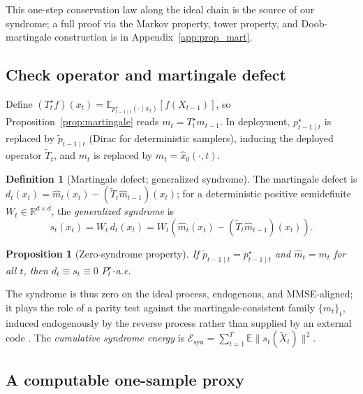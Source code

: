 \documentclass{article}
\theoremstyle{plain}
\newtheorem{proposition}[theorem]{Proposition}
\theoremstyle{definition}
\newtheorem{definition}[theorem]{Definition}
\theoremstyle{remark}
\begin{document}
This one-step conservation law along the ideal chain is the source of our
syndrome; a full proof via the Markov property, tower property, and
Doob-martingale construction is in Appendix~\ref{app:prop_mart}.

\subsection{Check operator and martingale defect}

Define \((T_t^\star f)(x_t) = \mathbb{E}_{p^\star_{t-1 \mid t}(\cdot \mid
x_t)}[f(X_{t-1})]\), so Proposition~\ref{prop:martingale} reads
\(m_t = T_t^\star m_{t-1}\). In deployment, \(p^\star_{t-1 \mid t}\) is
replaced by \(\tilde p_{t-1 \mid t}\) (Dirac for deterministic samplers),
inducing the deployed operator \(\tilde T_t\), and \(m_t\) is replaced by
\(\hat m_t = \hat x_0(\cdot,t)\).

\begin{definition}[Martingale defect; generalized syndrome]\label{def:defect}
The martingale defect is
\(d_t(x_t) = \hat m_t(x_t) - (\tilde T_t \hat m_{t-1})(x_t)\); for a
deterministic positive semidefinite \(W_t\in\mathbb{R}^{d\times d}\), the
\emph{generalized syndrome} is
\begin{equation}
s_t(x_t) = W_t\, d_t(x_t)
 = W_t\!\left(\hat m_t(x_t) - (\tilde T_t \hat m_{t-1})(x_t)\right).
\label{eq:syndrome}
\end{equation}
\end{definition}

\begin{proposition}[Zero-syndrome property]\label{prop:zero_syn}
If \(\tilde p_{t-1 \mid t} = p^\star_{t-1 \mid t}\) and \(\hat m_t = m_t\)
for all \(t\), then \(d_t \equiv s_t \equiv 0\) \(P_t^\star\)-a.e.
\end{proposition}

The syndrome is thus zero on the ideal process, endogenous, and
MMSE-aligned; it plays the role of a parity test against the
martingale-consistent family \(\{m_t\}_t\), induced endogenously by the
reverse process rather than supplied by an external code
\citep{choukroun2023ddecc}. The \emph{cumulative syndrome energy} is
\(\mathcal{E}_{\mathrm{syn}} = \sum_{t=1}^T \mathbb{E}\|s_t(\tilde X_t)\|^2\).

\subsection{A computable one-sample proxy}
\end{document}
